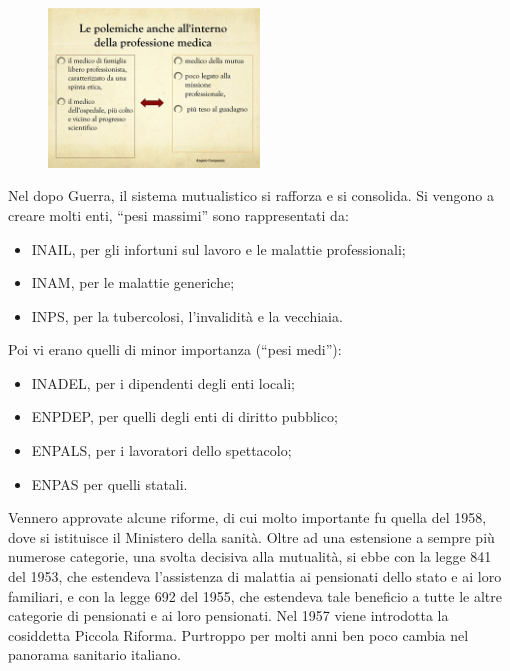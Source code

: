 \begin{figure}[!ht]
\centering
	\includegraphics[width=0.5\textwidth]{38/image5.jpg}
	\end{figure}
	
Nel dopo Guerra, il sistema mutualistico si rafforza e si consolida. Si
vengono a creare molti enti, ``pesi massimi'' sono rappresentati da:
\begin{itemize}
\item INAIL, per gli infortuni sul lavoro e le malattie professionali;
\item INAM, per le malattie generiche;
\item INPS, per la tubercolosi, l'invalidità e la vecchiaia.
\end{itemize}

Poi vi erano quelli di minor importanza (``pesi medi''):
\begin{itemize}
\item INADEL, per i dipendenti degli enti locali;
\item ENPDEP, per quelli degli enti di diritto pubblico;
\item ENPALS, per i lavoratori dello spettacolo;
\item ENPAS per quelli statali.
\end{itemize}

Vennero approvate alcune riforme, di cui molto importante fu quella del
1958, dove si istituisce il Ministero della sanità. Oltre ad una
estensione a sempre più numerose categorie, una svolta decisiva alla
mutualità, si ebbe con la legge 841 del 1953, che estendeva l'assistenza
di malattia ai pensionati dello stato e ai loro familiari, e con la
legge 692 del 1955, che estendeva tale beneficio a tutte le altre
categorie di pensionati e ai loro pensionati. Nel 1957 viene introdotta
la cosiddetta Piccola Riforma. Purtroppo per molti anni ben poco cambia
nel panorama sanitario italiano.

